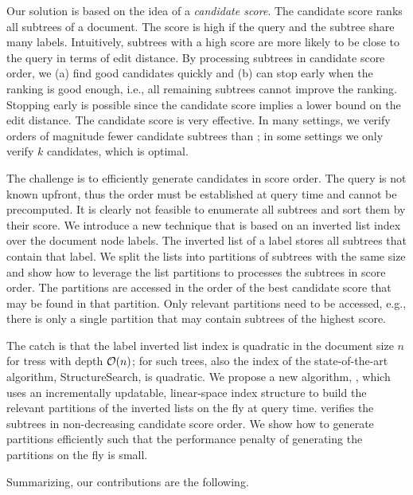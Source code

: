 Our solution is based on the idea of a \emph{candidate score}. The candidate score ranks all subtrees of a document. The score is high if the query and the subtree share many labels. Intuitively, subtrees with a high score are more likely to be close to the query in terms of edit distance. By processing subtrees in candidate score order, we (a) find good candidates quickly and (b) can stop early when the ranking is good enough, i.e., all remaining subtrees cannot improve the ranking. Stopping early is possible since the candidate score implies a lower bound on the edit distance. The candidate score is very effective. In many settings, we verify orders of magnitude fewer candidate subtrees than \structuresearch{}; in some settings we only verify $k$ candidates, which is optimal.

The challenge is to efficiently generate candidates in score order. The query is not known upfront, thus the order must be established at query time and cannot be precomputed. It is clearly not feasible to enumerate all subtrees and sort them by their score. We introduce a new technique that is based on an inverted list index over the document node labels. The inverted list of a label stores all subtrees that contain that label. We split the lists into partitions of subtrees with the same size and show how to leverage the list partitions to processes the subtrees in score order. The partitions are accessed in the order of the best candidate score that may be found in that partition. Only relevant partitions need to be accessed, e.g., there is only a single partition that may contain subtrees of the highest score.

The catch is that the label inverted list index is quadratic in the document size $n$ for tress with depth $\mathcal{O}(n)$; for such trees, also the index of the state-of-the-art algorithm, Structure\-Search, is quadratic. We propose a new algorithm, \shincone{}, which uses an incrementally updatable, linear-space index structure to build the relevant partitions of the inverted lists on the fly at query time. \shincone{} verifies the subtrees in non-decreasing candidate score order. We show how to generate partitions efficiently such that the performance penalty of generating the partitions on the fly is small.

Summarizing, our contributions  are the following.

